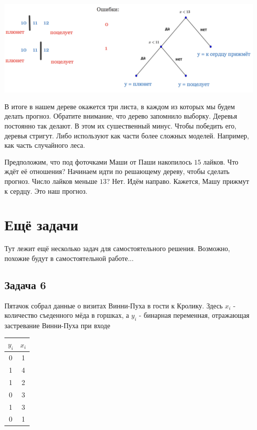 \documentclass[12pt, a4paper, oneside]{article}
\begin{document}
{	\begin{center}
		\includegraphics[scale=0.28]{class_tree_2.png}
	\end{center} 	
	
	В итоге в нашем дереве окажется три листа, в каждом из которых мы будем делать прогноз. Обратите внимание, что дерево запомнило выборку.  Деревья постоянно так делают. В этом их сушественный минус. Чтобы победить его, деревья стригут. Либо используют как части более сложных моделей. Например, как часть случайного леса. 
	
	Предположим, что под фоточками Маши от Паши накопилось $15$ лайков. Что ждёт её отношения? Начинаем идти по решающему дереву, чтобы сделать прогноз. Число лайков меньше $13$? Нет. Идём направо. Кажется, Машу прижмут к сердцу. Это наш прогноз.  	
}


\section*{Ещё задачи} 

Тут лежит ещё несколько задач для самостоятельного решения. Возможно, похожие будут в самостоятельной работе... 

\subsection*{Задача 6}

Пятачок собрал данные о визитах Винни-Пуха в гости к Кролику. Здесь $x_i$ - количество съеденного мёда в горшках, а $y_i$  - бинарная переменная, отражающая застревание Винни-Пуха при входе 

\begin{center}
	\begin{tabular}{c|c}
		$y_i$ & $x_i$ \\
		\hline
		0  & 1 \\
		1 & 4\\
		1 & 2\\
		0 & 3 \\
		1 & 3 \\
		0 & 1
	\end{tabular}
\end{center}
\end{document}
